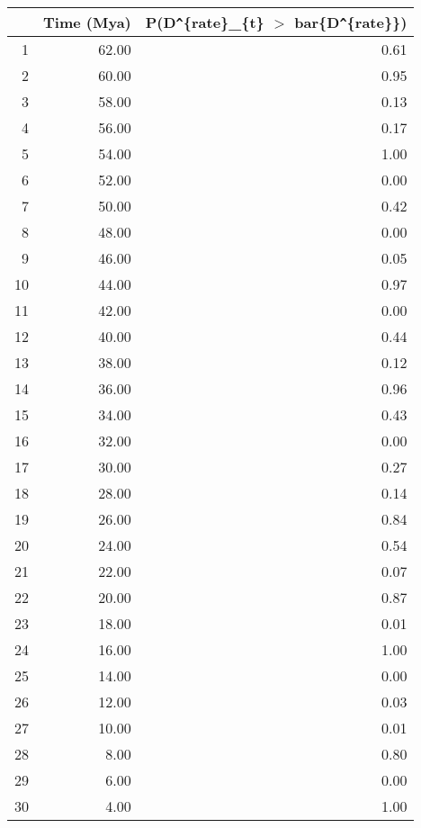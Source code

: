 \begin{table}[ht]
\centering
\begin{tabular}{rrr}
  \hline
 & Time (Mya) & P(D\verb|^|\{rate\}\_\{t\} $>$ bar\{D\verb|^|\{rate\}\}) \\ 
  \hline
1 & 62.00 & 0.61 \\ 
  2 & 60.00 & 0.95 \\ 
  3 & 58.00 & 0.13 \\ 
  4 & 56.00 & 0.17 \\ 
  5 & 54.00 & 1.00 \\ 
  6 & 52.00 & 0.00 \\ 
  7 & 50.00 & 0.42 \\ 
  8 & 48.00 & 0.00 \\ 
  9 & 46.00 & 0.05 \\ 
  10 & 44.00 & 0.97 \\ 
  11 & 42.00 & 0.00 \\ 
  12 & 40.00 & 0.44 \\ 
  13 & 38.00 & 0.12 \\ 
  14 & 36.00 & 0.96 \\ 
  15 & 34.00 & 0.43 \\ 
  16 & 32.00 & 0.00 \\ 
  17 & 30.00 & 0.27 \\ 
  18 & 28.00 & 0.14 \\ 
  19 & 26.00 & 0.84 \\ 
  20 & 24.00 & 0.54 \\ 
  21 & 22.00 & 0.07 \\ 
  22 & 20.00 & 0.87 \\ 
  23 & 18.00 & 0.01 \\ 
  24 & 16.00 & 1.00 \\ 
  25 & 14.00 & 0.00 \\ 
  26 & 12.00 & 0.03 \\ 
  27 & 10.00 & 0.01 \\ 
  28 & 8.00 & 0.80 \\ 
  29 & 6.00 & 0.00 \\ 
  30 & 4.00 & 1.00 \\ 
   \hline
\end{tabular}
\label{tab:rate_peak}
\end{table}
